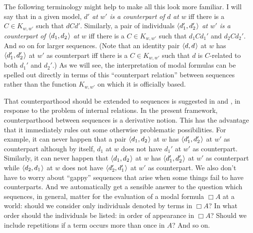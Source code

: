 \documentclass[11pt]{woarticle}
\newcommand{\cmnt}[1]{\iffalse #1 \fi}
\theoremstyle{break}
\theoremstyle{nonumberplain}
\newcommand{\1}{\;\,|\;\,}
\renewcommand{\t}[1]{\ensuremath{\langle #1  \makebox[.2ex]{}\rangle}}
\begin{document}
The following terminology might help to make all this look more familiar. I will
say that in a given model, \emph{$d'$ at $w'$ is a counterpart of $d$ at $w$}
iff there is a $C \in K_{w,w'}$ such that $dCd'$. Similarly, a pair of
individuals \emph{$\t{d_1',d_2'}$ at $w'$ is a counterpart of $\t{d_1,d_2}$ at
  $w$} iff there is a $C \in K_{w,w'}$ such that $d_1Cd_1'$ and $d_2Cd_2'$. And
so on for larger sequences. (Note that an identity pair $\t{d,d}$ at $w$ has
$\t{d_1',d_2'}$ at $w'$ as counterpart iff there is a $C \in K_{w,w'}$ such that
$d$ is $C$-related to both $d_1'$ and $d_2'$.) As we will see, the
interpretation of modal formulas can be spelled out directly in terms of this
``counterpart relation'' between sequences rather than the function $K_{w,w'}$
on which it is officially based.

That counterparthood should be extended to sequences is suggested in
\cite{lewis83psct} and \cite{plurality}, in response to the problem of internal
relations. In the present framework, counterparthood between sequences is a
derivative notion. This has the advantage that it immediately rules out some
otherwise problematic possibilities. For example, it can never happen that a
pair $\t{d_1,d_2}$ at $w$ has $\t{d_1',d_2'}$ at $w'$ as counterpart although by
itself, $d_1$ at $w$ does not have $d_1'$ at $w'$ as counterpart. Similarly, it
can never happen that $\t{d_1,d_2}$ at $w$ has $\t{d_1',d_2'}$ at $w'$ as
counterpart while $\t{d_2,d_1}$ at $w$ does not have $\t{d_2',d_1'}$ at $w'$ as
counterpart. We also don't have to worry about ``gappy'' sequences that arise
when some things fail to have counterparts. And we automatically get a sensible
answer to the question which sequences, in general, matter for the evaluation of
a modal formula $\Box A$ at a world: should we consider only individuals denoted
by terms in $\Box A$? In what order should the individuals be listed: in order
of appearance in $\Box A$? Should we include repetitions if a term occurs more
than once in $A$? And so on.

\cmnt{%
  A new possibility arising from multiple counterpart relations is that in
  negative models, we could have one relation linking $d$ to $d'$ and another
  relation linking $d$ to no counterpart at all. In positive models, $d$ could
  be linked to an ``inner'' individual by one relation and to an ``outer''
  individual by another. Arguably, this should be allowed. For example, it might
  be that some George counterparts are childless. Relative to this choice of
  George counterpart, `Elizabeth' is empty, while it is non-empty relative to
  other choices of George counterpart.
} %
\end{document}
